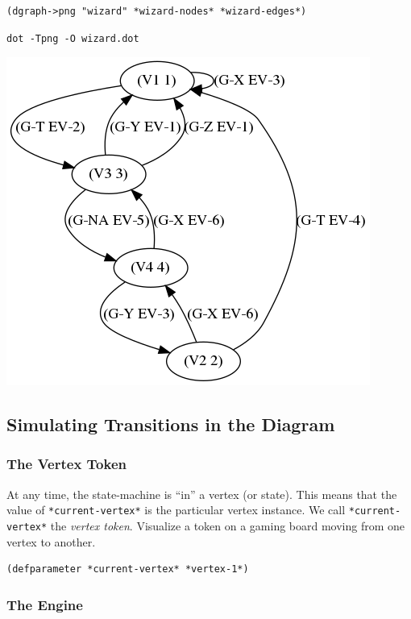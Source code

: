 \documentclass[10pt,oneside,x11names]{article}
\begin{document}
\begin{verbatim}
(dgraph->png "wizard" *wizard-nodes* *wizard-edges*)
\end{verbatim}

\begin{verbatim}
dot -Tpng -O wizard.dot
\end{verbatim}
\begin{center}
\includegraphics[width=.9\linewidth]{wizard.dot.png}
\end{center}

\subsection{Simulating Transitions in the Diagram}
\label{sec:orgbd930a0}

\subsubsection{The Vertex Token}
\label{sec:org39c42ff}

At any time, the state-machine is ``in'' a vertex (or state). This means that
the value of \texttt{*current-vertex*} is the particular vertex instance. We call
\texttt{*current-vertex*} the \emph{vertex token}. Visualize a token on a gaming board
moving from one vertex to another.

\begin{verbatim}
(defparameter *current-vertex* *vertex-1*)
\end{verbatim}

\subsubsection{The Engine}
\label{sec:org171021e}
\end{document}
